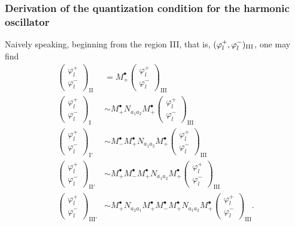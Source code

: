 \subsubsection{Derivation of the quantization condition for the harmonic oscillator}
Naively speaking, beginning from the region III, that is, $(\varphi_l^+,\varphi_l^-)_{\mathrm{III}}$, one may find
\begin{align}
    \begin{pmatrix}
        \varphi_l^+ \\ \varphi_l^-
    \end{pmatrix}_{\mathrm{II}}
    &= M_{+}^\bullet
    \begin{pmatrix}
        \varphi_l^+ \\ \varphi_l^-
    \end{pmatrix}_{\mathrm{III}} \\
    \begin{pmatrix}
        \varphi_l^+ \\ \varphi_l^-
    \end{pmatrix}_{\mathrm{I}}
    &\sim M_{+}^\bullet N_{a_1a_2} M_{+}^\bullet
    \begin{pmatrix}
        \varphi_l^+ \\ \varphi_l^-
    \end{pmatrix}_{\mathrm{III}} \\
    \begin{pmatrix}
        \varphi_l^+ \\ \varphi_l^-
    \end{pmatrix}_{\mathrm{I'}}
    &\sim M_{-}^\bullet M_{+}^\bullet N_{a_1a_2} M_{+}^\bullet
    \begin{pmatrix}
        \varphi_l^+ \\ \varphi_l^-
    \end{pmatrix}_{\mathrm{III}} \\
    \begin{pmatrix}
        \varphi_l^+ \\ \varphi_l^-
    \end{pmatrix}_{\mathrm{II'}}
    &\sim M_{+}^\bullet M_{-}^\bullet M_{+}^\bullet N_{a_1a_2} M_{+}^\bullet
    \begin{pmatrix}
        \varphi_l^+ \\ \varphi_l^-
    \end{pmatrix}_{\mathrm{III}} \\
    \begin{pmatrix}
        \varphi_l^+ \\ \varphi_l^-
    \end{pmatrix}_{\mathrm{III'}}
    &\sim M_{+}^\bullet N_{a_2a_1} M_{+}^\bullet M_{-}^\bullet M_{+}^\bullet N_{a_1a_2} M_{+}^\bullet
    \begin{pmatrix}
        \varphi_l^+ \\ \varphi_l^-
    \end{pmatrix}_{\mathrm{III}} .
    \label{src:2510_11766:eq:quant_oscillator_naive}
\end{align}
